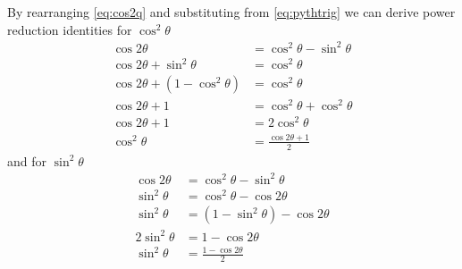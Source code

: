 By rearranging \eqref{eq:cos2q} and substituting from \eqref{eq:pythtrig} we can derive power reduction identities for $\cos^2 \theta$
\begin{align}
  \cos{2\theta} &= \cos^2 \theta - \sin^2\theta \nonumber \\
  \cos{2\theta} + \sin^2\theta &= \cos^2\theta \nonumber \\
  \cos{2\theta} + (1-\cos^2 \theta) &=\cos^2\theta \nonumber \\
  \cos{2\theta} + 1 &= \cos^2\theta + \cos^2\theta \nonumber \\
  \cos{2\theta}+1 &= 2 \cos^2\theta \nonumber \\
  \cos^2\theta &= \frac{\cos{2\theta}+1}{2}
  \label{eq:cossqq}
\end{align}
and for $\sin^2 \theta$
\begin{align}
  \cos{2\theta} &= \cos^2 \theta - \sin^2\theta \nonumber \\
  \sin^2 \theta &= \cos^2 \theta - \cos{2 \theta} \nonumber \\
  \sin^2 \theta &= (1-\sin^2 \theta) - \cos{2 \theta} \nonumber \\
  2 \sin^2 \theta &= 1-\cos{2\theta} \nonumber \\
  \sin^2 \theta &= \frac{1-\cos{2\theta}}{2}
  \label{eq:sinsqq}
\end{align}

